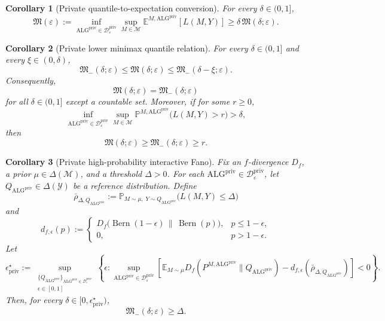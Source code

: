 \documentclass[journal]{IEEEtran}
\newtheorem{corollary}{Corollary}
\newcommand{\Bern}{\operatorname{Bern}}
\newcommand{\ALG}{\mathrm{ALG}}
\begin{document}
\begin{corollary}[Private quantile-to-expectation conversion]
\label{cor:private-quantile-to-expectation}
For every \(\delta\in(0,1]\),
\[
\mathfrak M(\varepsilon)
:=
\inf_{\ALG^{\mathrm{priv}}\in\mathcal D_\varepsilon^{\mathrm{priv}}}
\sup_{M\in\mathcal M}
\mathbb E^{M,\ALG^{\mathrm{priv}}}[L(M,Y)]
\ge
\delta\,\mathfrak M(\delta;\varepsilon).
\]
\end{corollary}

\begin{corollary}[Private lower minimax quantile relation]
\label{cor:private-lower-minimax-quantile-relation}
For every \(\delta\in(0,1]\) and every \(\xi\in(0,\delta)\),
\[
\mathfrak M_-(\delta;\varepsilon)
\le
\mathfrak M(\delta;\varepsilon)
\le
\mathfrak M_-(\delta-\xi;\varepsilon).
\]
Consequently,
\[
\mathfrak M(\delta;\varepsilon)
=
\mathfrak M_-(\delta;\varepsilon)
\]
for all \(\delta\in(0,1]\) except a countable set. Moreover, if for some
\(r\ge 0\),
\[
\inf_{\ALG^{\mathrm{priv}}\in\mathcal D_\varepsilon^{\mathrm{priv}}}
\sup_{M\in\mathcal M}
\mathbb P^{M,\ALG^{\mathrm{priv}}}\bigl(L(M,Y)>r\bigr)
>
\delta,
\]
then
\[
\mathfrak M(\delta;\varepsilon)
\ge
\mathfrak M_-(\delta;\varepsilon)
\ge r.
\]
\end{corollary}

\begin{corollary}[Private high-probability interactive Fano] Fix an
\(f\)-divergence \(D_f\), a prior \(\mu\in\Delta(\mathcal M)\), and a threshold
\(\Delta>0\). For each
\(\ALG^\mathrm{priv}\in\mathcal D^{\mathrm{priv}}_\varepsilon\), let
\(Q_{\ALG^\mathrm{priv}}\in\Delta(\mathcal Y)\) be a reference distribution. Define
\[
\bar\rho_{\Delta,Q_{\ALG^\mathrm{priv}}}
:=
\mathbb P_{M\sim\mu,\;Y\sim Q_{\ALG^\mathrm{priv}}}
\bigl(L(M,Y)\le\Delta\bigr)
\]
and
\[
d_{f,\epsilon}(p)
:=
\begin{cases}
D_f\bigl(\Bern(1-\epsilon)\,\|\,\Bern(p)\bigr),
& p\le 1-\epsilon,\\[0.75ex]
0, & p>1-\epsilon.
\end{cases}
\]
Let
\[
\epsilon^\star_{\mathrm{priv}}
:=
\sup_{\substack{\{Q_{\ALG^\mathrm{priv}}\}_{\ALG^\mathrm{priv}\in\mathcal D^{\mathrm{priv}}_\varepsilon}\\
\epsilon\in[0,1]}}
\left\{
\epsilon:
\sup_{\ALG^\mathrm{priv}\in\mathcal D^{\mathrm{priv}}_\varepsilon}
\left[
\mathbb E_{M\sim\mu}
D_f(P^{M,\ALG^\mathrm{priv}}\|Q_{\ALG^\mathrm{priv}})
-
d_{f,\epsilon}(\bar\rho_{\Delta,Q_{\ALG^\mathrm{priv}}})
\right]
<0
\right\}.
\]
Then, for every \(\delta\in[0,\epsilon^\star_{\mathrm{priv}})\),
\[
\mathfrak M_-(\delta;\varepsilon)\ge \Delta.
\]
\end{corollary}
\end{document}
